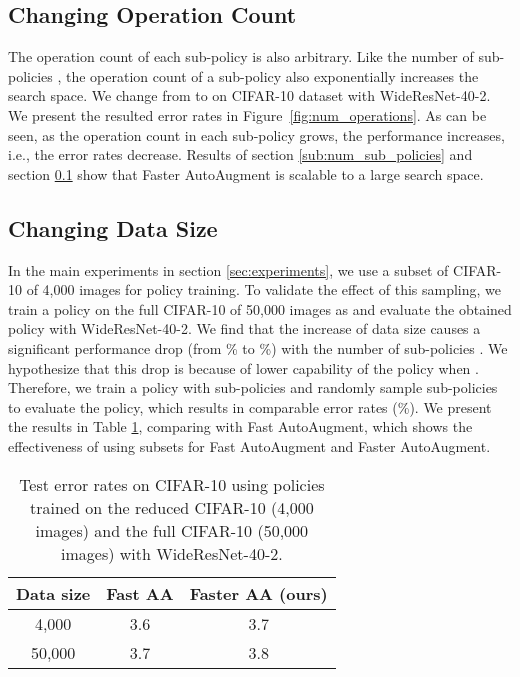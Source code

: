 \documentclass[10pt,twocolumn,letterpaper]{article}
\def\Figref#1{Figure~\ref{#1}}
\newcommand{\Tabref}[1]{Table \ref{#1}}
\newcommand{\autoaugment}{AutoAugment\xspace}
\newcommand{\faster}{Faster \autoaugment}
\newcommand{\fast}{Fast \autoaugment}
\begin{document}
\subsection{Changing Operation Count}\label{sub:operation_count}

The operation count  of each sub-policy is also arbitrary. Like the number of sub-policies , the operation count of a sub-policy  also exponentially increases the search space. We change  from  to  on CIFAR-10 dataset with WideResNet-40-2. We present the resulted error rates in \Figref{fig:num_operations}. As can be seen, as the operation count in each sub-policy grows, the performance increases, i.e., the error rates decrease. Results of section \ref{sub:num_sub_policies} and section \ref{sub:operation_count} show that \faster is scalable to a large search space.


\subsection{Changing Data Size}

In the main experiments in section \ref{sec:experiments}, we use a subset of CIFAR-10 of 4,000 images for policy training. To validate the effect of this sampling, we train a policy on the full CIFAR-10 of 50,000 images as \cite{Lim2019} and evaluate the obtained policy with WideResNet-40-2. We find that the increase of data size causes a significant performance drop (from \% to \%) with the number of sub-policies . We hypothesize that this drop is because of lower capability of the policy when . Therefore, we train a policy with  sub-policies and randomly sample  sub-policies to evaluate the policy, which results in comparable error rates (\%). We present the results in \Tabref{tab:full_cifar10}, comparing with \fast \cite{Lim2019}, which shows the effectiveness of using subsets for \fast and \faster.

\begin{table}
    \centering
    \begin{tabular}{c|c|c}
    Data size & Fast AA \cite{Lim2019} & Faster AA (ours) \\ \hline
    4,000  & 3.6     & 3.7 \\
    50,000 & 3.7     &  3.8
    \end{tabular}
    \vspace{5pt}
    \caption{Test error rates on CIFAR-10 using policies trained on the reduced CIFAR-10 (4,000 images) and the full CIFAR-10 (50,000 images) with WideResNet-40-2.}
    \label{tab:full_cifar10}
\end{table}
\end{document}
